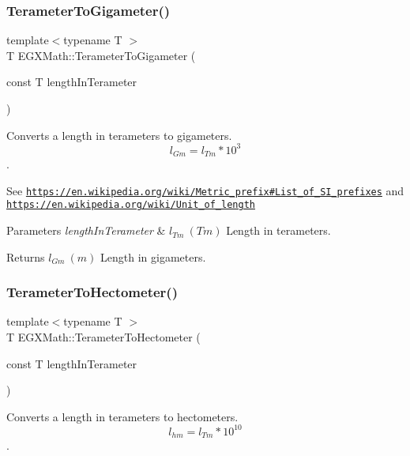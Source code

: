 \subsubsection{\texorpdfstring{Terameter\+To\+Gigameter()}{TerameterToGigameter()}}
{\footnotesize\ttfamily template$<$typename T $>$ \\
T E\+G\+X\+Math\+::\+Terameter\+To\+Gigameter (\begin{DoxyParamCaption}\item[{const T}]{length\+In\+Terameter }\end{DoxyParamCaption})}



Converts a length in terameters to gigameters. \[ l_{Gm}=l_{Tm} * 10^{3} \]. 

See \href{https://en.wikipedia.org/wiki/Metric_prefix#List_of_SI_prefixes}{\tt https\+://en.\+wikipedia.\+org/wiki/\+Metric\+\_\+prefix\#\+List\+\_\+of\+\_\+\+S\+I\+\_\+prefixes} and \href{https://en.wikipedia.org/wiki/Unit_of_length}{\tt https\+://en.\+wikipedia.\+org/wiki/\+Unit\+\_\+of\+\_\+length} 
\begin{DoxyParams}{Parameters}
{\em length\+In\+Terameter} & $ l_{Tm}\ (Tm)$ Length in terameters. \\
\hline
\end{DoxyParams}
\begin{DoxyReturn}{Returns}
$ l_{Gm}\ (m)$ Length in gigameters. 
\end{DoxyReturn}
\mbox{\label{group___e_g_x_math-_conversions-_length_conversions-_terameter-_s_i_ga8e0944895887a45b1e2218ae7a511e4f}} 
\subsubsection{\texorpdfstring{Terameter\+To\+Hectometer()}{TerameterToHectometer()}}
{\footnotesize\ttfamily template$<$typename T $>$ \\
T E\+G\+X\+Math\+::\+Terameter\+To\+Hectometer (\begin{DoxyParamCaption}\item[{const T}]{length\+In\+Terameter }\end{DoxyParamCaption})}



Converts a length in terameters to hectometers. \[ l_{hm}=l_{Tm} * 10^{10} \]. 

